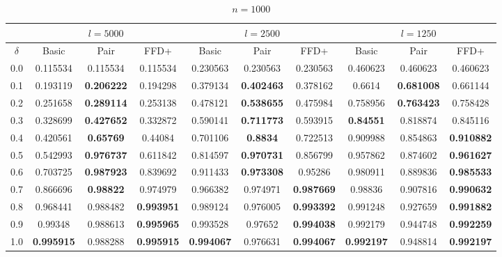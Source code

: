 \documentclass[oribibl]{llncs}
\begin{document}
\begin{table}[!htb]
	\centering
	\caption{$n = 1000$}
	\begin{tabular}{c@{\hspace{15pt}}c@{\hspace{10pt}}c@{\hspace{10pt}}c@{\hspace{7pt}}| @{\hspace{7pt}}c@{\hspace{10pt}}c@{\hspace{10pt}}c@{\hspace{7pt}}| @{\hspace{7pt}} c@{\hspace{10pt}}c@{\hspace{10pt}}c}
		\noalign{\smallskip}
		& \multicolumn{3}{c}{$l = 5000$} & \multicolumn{3}{c}{$l = 2500$} & \multicolumn{3}{c}{$l = 1250$} \\
		\hline\noalign{\smallskip}
		$\delta$ & Basic & Pair & FFD+ & Basic & Pair & FFD+ & Basic & Pair & FFD+ \\
		\noalign{\smallskip}
		\hline
		\noalign{\smallskip}
		0.0	&0.115534&	0.115534&	0.115534&	0.230563&	0.230563&	0.230563&	0.460623&	0.460623&	0.460623 \\
		0.1	&0.193119&	\textbf{0.206222} &	0.194298&	0.379134&	\textbf{0.402463}&	0.378162&	0.6614&	\textbf{0.681008}&	0.661144 \\
		0.2	&0.251658&	\textbf{0.289114} &	0.253138&	0.478121&	\textbf{0.538655}&	0.475984&	0.758956&	\textbf{0.763423}&	0.758428 \\
		0.3	&0.328699&	\textbf{0.427652} &	0.332872&	0.590141&	\textbf{0.711773}&	0.593915&	\textbf{0.84551}&	0.818874&	0.845116 \\
		0.4	&0.420561&	\textbf{0.65769} &	0.44084&	0.701106&	\textbf{0.8834}&	0.722513&	0.909988&	0.854863&	\textbf{0.910882} \\
		0.5	&0.542993&	\textbf{0.976737} &	0.611842&	0.814597&	\textbf{0.970731}&	0.856799&	0.957862&	0.874602&	\textbf{0.961627} \\
		0.6	&0.703725&	\textbf{0.987923} &	0.839692&	0.911433&	\textbf{0.973308}&	0.95286&	0.980911&	0.889836&	\textbf{0.985533} \\
		0.7	&0.866696&	\textbf{0.98822} 	& 0.974979&	0.966382&	0.974971&	\textbf{0.987669}&	0.98836&	0.907816&	\textbf{0.990632} \\
		0.8	&0.968441&	0.988482& \textbf{0.993951} &	0.989124&	0.976005&	\textbf{0.993392}&	0.991248&	0.927659&	\textbf{0.991882} \\
		0.9	&0.99348&	0.988613& \textbf{0.995965} &	0.993528&	0.97652&	\textbf{0.994038}&	0.992179&	0.944748&	\textbf{0.992259} \\
		1.0	& \textbf{0.995915} & 0.988288&	\textbf{0.995915} &	\textbf{0.994067}&	0.976631&	\textbf{0.994067}&	\textbf{0.992197}&	0.948814&	\textbf{0.992197} \\
		\hline
	\end{tabular}
	\label{table:n1000}
\end{table}	







\end{document}
